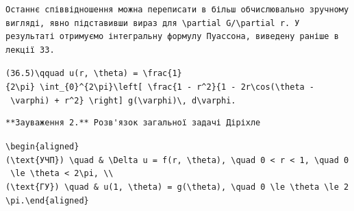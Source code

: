 \documentclass[
  ukrainian,
]{article}
\begin{document}
\begin{verbatim}
Останнє співвідношення можна переписати в більш обчислювально зручному вигляді, явно підставивши вираз для \partial G/\partial r. У результаті отримуємо інтегральну формулу Пуассона, виведену раніше в лекції 33.
\end{verbatim}

\texttt{(36.5)\textbackslash{}qquad\ u(r,\ \textbackslash{}theta)\ =\ \textbackslash{}frac\{1\}\{2\textbackslash{}pi\}\ \textbackslash{}int\_\{0\}\^{}\{2\textbackslash{}pi\}\textbackslash{}left{[}\ \textbackslash{}frac\{1\ -\ r\^{}2\}\{1\ -\ 2r\textbackslash{}cos(\textbackslash{}theta\ -\ \textbackslash{}varphi)\ +\ r\^{}2\}\ \textbackslash{}right{]}\ g(\textbackslash{}varphi)\textbackslash{},\ d\textbackslash{}varphi.}

\begin{verbatim}
**Зауваження 2.** Розв'язок загальної задачі Діріхле
\end{verbatim}

\texttt{\textbackslash{}begin\{aligned\}(\textbackslash{}text\{УЧП\})\ \textbackslash{}quad\ \&\ \textbackslash{}Delta\ u\ =\ f(r,\ \textbackslash{}theta),\ \textbackslash{}quad\ 0\ \textless{}\ r\ \textless{}\ 1,\ \textbackslash{}quad\ 0\ \textbackslash{}le\ \textbackslash{}theta\ \textless{}\ 2\textbackslash{}pi,\ \textbackslash{}\textbackslash{}(\textbackslash{}text\{ГУ\})\ \textbackslash{}quad\ \&\ u(1,\ \textbackslash{}theta)\ =\ g(\textbackslash{}theta),\ \textbackslash{}quad\ 0\ \textbackslash{}le\ \textbackslash{}theta\ \textbackslash{}le\ 2\textbackslash{}pi.\textbackslash{}end\{aligned\}}
\end{document}
